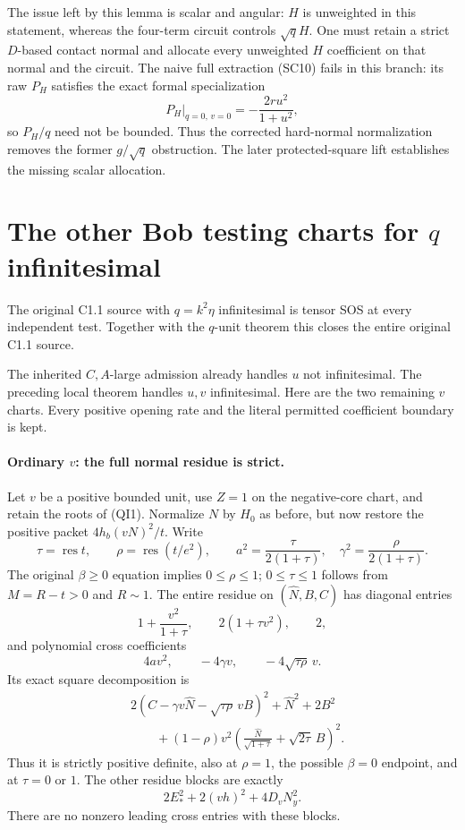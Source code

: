 The issue left by this lemma is scalar and angular: $H$ is unweighted in this
statement, whereas the four-term circuit controls $\sqrt q H$.
One must retain a strict $D$-based contact normal and allocate every
unweighted $H$ coefficient on that normal and the circuit. The
naive full extraction (SC10) fails in this branch: its raw $P_H$
satisfies the exact formal specialization
\[
       P_H\big|_{q=0,\,v=0}=-\frac{2ru^2}{1+u^2},
\]
so $P_H/q$ need not be bounded. Thus the corrected hard-normal
normalization removes the former $g/\sqrt q$ obstruction. The later
protected-square lift establishes the missing scalar allocation.


\section{\texorpdfstring{The other Bob testing charts for $q$ infinitesimal}{The other Bob testing charts for q infinitesimal}}
\label{component:pd2ecc6ac1891}

\label{pd2ecc6ac1891:sec:r7-c1-q-inf-remote}
\begin{theorem}
The original C1.1 source with $q=k^2\eta$ infinitesimal is tensor SOS
at every independent test. Together with the $q$-unit theorem this
closes the entire original C1.1 source.
\end{theorem}
The inherited $C,A$-large admission already handles $u$ not
infinitesimal. The preceding local theorem handles $u,v$
infinitesimal. Here are the two remaining $v$ charts. Every positive
opening rate and the literal permitted coefficient boundary is kept.

\paragraph{Ordinary $v$: the full normal residue is strict.}
Let $v$ be a positive bounded unit, use $Z=1$ on the negative-core
chart, and retain the roots of (QI1). Normalize $N$ by $H_0$ as
before, but now restore the positive packet $4h_b(vN)^2/t$.
Write
\[
 \tau=\operatorname{res}t,\qquad
 \rho=\operatorname{res}(t/e^2),\qquad
 a^2=\frac{\tau}{2(1+\tau)},\quad
 \gamma^2=\frac{\rho}{2(1+\tau)}.
\]
The original $\beta\ge0$ equation implies $0\le\rho\le1$;
$0\le\tau\le1$ follows from $M=R-t>0$ and $R\sim1$.
The entire residue on $(\widehat N,B,C)$ has diagonal entries
\[
 1+\frac{v^2}{1+\tau},\qquad 2(1+\tau v^2),\qquad 2,
\]
and polynomial cross coefficients
\[
 4av^2,\qquad -4\gamma v,\qquad -4\sqrt{\tau\rho}\,v.
\]
Its exact square decomposition is
\begin{align*}
 &2(C-\gamma v\widehat N-\sqrt{\tau\rho}\,vB)^2
       +\widehat N^2+2B^2\\
 &\qquad +(1-\rho)v^2
    \left(\frac{\widehat N}{\sqrt{1+\tau}}+
                         \sqrt{2\tau}\,B\right)^2.
 \tag{QR1}
\end{align*}
Thus it is strictly positive definite, also at $\rho=1$, the
possible $\beta=0$ endpoint, and at $\tau=0$ or $1$.
The other residue blocks are exactly
\[
                       2E_*^2+2(vh)^2+4D_vN_y^2.
\]
There are no nonzero leading cross entries with these blocks.


